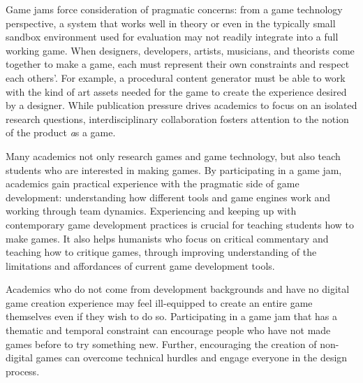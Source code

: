\documentclass{acm_proc_article-sp}
\newcommand{\mytodo}[1]{\textbf{[[#1]]}}
\begin{document}
Game jams force consideration of pragmatic concerns: from a game technology perspective, a system that works well in theory or even in the typically small sandbox environment used for evaluation may not readily integrate into a full working game.
When designers, developers, artists, musicians, and theorists come together to make a game, each must represent their own constraints and respect each others'.
For example, a procedural content generator must be able to work with the kind of art assets needed for the game to create the experience desired by a designer.
While publication pressure drives academics to focus on an isolated research questions, interdisciplinary collaboration fosters attention to the notion of the product {\emph as a game}.

Many academics not only research games and game technology, but also teach students who are interested in making games.
By participating in a game jam, academics gain practical experience with the pragmatic side of game development: understanding how different tools and game engines work and working through team dynamics.
Experiencing and keeping up with contemporary game development practices is crucial for teaching students how to make games.
It also helps humanists who focus on critical commentary and teaching how to critique games, through improving understanding of the limitations and affordances of current game development tools.

Academics who do not come from development backgrounds and have no digital game creation experience may feel ill-equipped to create an entire game themselves even if they wish to do so.
Participating in a game jam that has a thematic and temporal constraint can encourage people who have not made games before to try something new.
Further, encouraging the creation of non-digital games can overcome technical hurdles and engage everyone in the design process.
\end{document}
